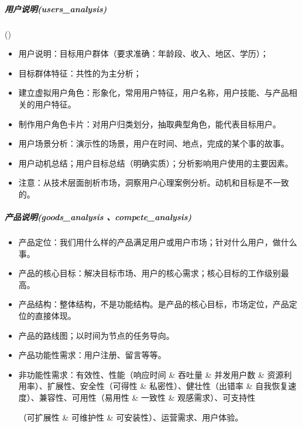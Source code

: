 \documentclass[letterpaper,11pt,english]{sphinxmanual}
\begin{document}
\subparagraph{用户说明(users\_analysis)}
\label{\detokenize{chapter_knowledge/MRD:users-analysis}}
{\hyperref[\detokenize{chapter_knowledge/users_analysis:users-analysis}]{}} ()
\begin{itemize}
\item {} 
用户说明：目标用户群体（要求准确：年龄段、收入、地区、学历）；

\item {} 
目标群体特征：共性的为主分析；

\item {} 
建立虚拟用户角色：形象化，常用用户特征，用户名称，用户技能、与产品相关的用户特征。

\item {} 
制作用户角色卡片：对用户归类划分，抽取典型角色，能代表目标用户。

\item {} 
用户场景分析：演示性的场景，用户在时间、地点，完成的某个事的故事。

\item {} 
用户动机总结；用户目标总结（明确实质）；分析影响用户使用的主要因素。

\item {} 
注意：从技术层面剖析市场，洞察用户心理案例分析。动机和目标是不一致的。

\end{itemize}


\subparagraph{产品说明(goods\_analysis 、compete\_analysis)}
\label{\detokenize{chapter_knowledge/MRD:goods-analysis-compete-analysis}}\begin{itemize}
\item {} 
产品定位：我们用什么样的产品满足用户或用户市场；针对什么用户，做什么事。

\item {} 
产品的核心目标：解决目标市场、用户的核心需求；核心目标的工作级别最高。

\item {} 
产品结构：整体结构，不是功能结构。是产品的核心目标，市场定位，产品定位的直接体现。

\item {} 
产品的路线图；以时间为节点的任务导向。

\item {} 
产品功能性需求：用户注册、留言等等。

\item {} 
非功能性需求：有效性、性能（响应时间 \& 吞吐量 \& 并发用户数 \&
资源利用率）、扩展性、安全性（可得性 \& 私密性）、健壮性（出错率 \&
自我恢复速度）、兼容性、可用性（易用性 \& 一致性 \&
观感需求）、可支持性%
\begin{footnote}[485]\sphinxAtStartFootnote
{}
%
\end{footnote}（可扩展性
\& 可维护性 \& 可安装性）、运营需求、用户体验。

\end{itemize}
\end{document}
